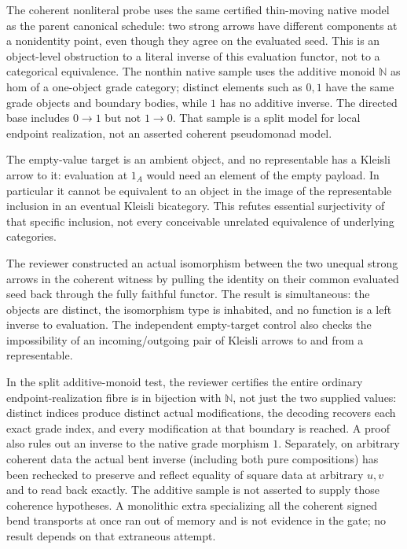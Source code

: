 \documentclass[11pt]{article}
\begin{document}
The coherent nonliteral probe uses the same certified thin-moving
native model as the parent canonical schedule: two strong arrows have
different components at a nonidentity point, even though they agree
on the evaluated seed. This is an object-level obstruction to a literal
inverse of this evaluation functor, not to a categorical equivalence.
The nonthin native sample uses the additive monoid $\mathbb N$ as hom
of a one-object grade category; distinct elements such as $0,1$ have the
same grade objects and boundary bodies, while $1$ has no additive inverse.
The directed base includes $0\to1$ but not $1\to0$. That sample is a
split model for local endpoint realization, not an asserted coherent
pseudomonad model.

The empty-value target is an ambient object, and no representable has a
Kleisli arrow to it: evaluation at $1_A$ would need an element of the
empty payload. In particular it cannot be equivalent to an object in
the image of the representable inclusion in an eventual Kleisli
bicategory. This refutes essential surjectivity of that specific
inclusion, not every conceivable unrelated equivalence of underlying
categories.

The reviewer constructed an actual isomorphism between the two unequal
strong arrows in the coherent witness by pulling the identity on their
common evaluated seed back through the fully faithful functor. The
result is simultaneous: the objects are distinct, the isomorphism type
is inhabited, and no function is a left inverse to evaluation. The
independent empty-target control also checks the impossibility of an
incoming/outgoing pair of Kleisli arrows to and from a representable.

In the split additive-monoid test, the reviewer certifies the entire
ordinary endpoint-realization fibre is in bijection with $\mathbb N$,
not just the two supplied values: distinct indices produce distinct
actual modifications, the decoding recovers each exact grade index,
and every modification at that boundary is reached. A proof also
rules out an inverse to the native grade morphism $1$. Separately,
on arbitrary coherent data the actual bent inverse (including both
pure compositions) has been rechecked to preserve and reflect
equality of square data at arbitrary $u,v$ and to read back exactly.
The additive sample is not asserted to supply those coherence
hypotheses. A monolithic extra specializing all the coherent signed
bend transports at once ran out of memory and is not evidence in the
gate; no result depends on that extraneous attempt.
\end{document}
